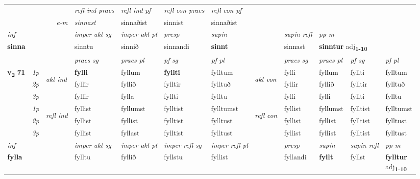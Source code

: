 \begin{longtable}[l]{X>{\footnotesize\itshape}llXXXXlXXXX}
 & && \textit{refl ind praes} & \textit{refl ind pf} & \textit{refl con praes} & \textit{refl con pf} \\*
\multicolumn{3}{r}{\textit{e-m}}& sinnast & sinnaðist & sinnist & sinnaðist \\*

\cmidrule{4-7}
   {\textit{inf}} & &  & \textit{imper akt sg} & \textit{imper akt pl}   & \textit{presp} & \textit{supin} && \textit{supin refl} & \textit{pp m} \\*
  {\textbf{sinna}} & && sinntu  & sinnið   & sinnandi &  \textbf{sinnt} && sinnast & \multicolumn{2}{l}{\textbf{sinntur} adj\textbf{\textsubscript{1-10}}} \\*

\midrule

 & &   & \textit{praes sg}  & \textit{praes pl}    & \textit{ pf sg} & \textit{pf pl} & & \textit{praes sg}  & \textit{praes pl}    & \textit{pf sg} & \textit{pf pl }  \\ \cmidrule{4-7} \cmidrule{9-12}
 \multirow{2}{*}{{{\textbf{v{\textsubscript{2}}} \Large{\textbf{71}}}}}  & 1p & \multirow{3}{*}{\begin{turn}{90}\textit{akt ind}\end{turn}} & \textbf{fylli} & fyllum & \textbf{fyllti} & fylltum & \multirow{3}{*}{\begin{turn}{90}\textit{akt con}\end{turn}} &fylli & fyllum & fyllti & fylltum\\*
 & 2p &  &  fyllir  & fyllið & fylltir & fylltuð & & fyllir & fyllið & fylltir & fylltuð \\*
 & 3p &  & fyllir & fylla & fyllti & fylltu & & fylli & fylli& fyllti & fylltu \\*
\cmidrule{4-7} \cmidrule{9-12}
 & 1p & \multirow{3}{*}{\begin{turn}{90}\textit{refl ind}\end{turn}}  & fyllist & fyllumst & fylltist & fylltumst & \multirow{3}{*}{\begin{turn}{90}\textit{refl con}\end{turn}}  &fyllist & fyllumst & fylltist & fylltumst \\*
 & 2p &  & fyllist & fyllist & fylltist & fylltust & &fyllist & fyllist & fylltist & fylltust \\*
 & 3p  & & fyllist & fyllast & fylltist & fylltust & & fyllist & fyllist& fylltist & fylltust \\*
\cmidrule{4-7} \cmidrule{9-12}

   {\textit{inf}} & &  & \textit{imper akt sg} & \textit{imper akt pl} & \textit{imper refl sg} & \textit{imper refl pl} && \textit{presp} & \textit{supin} & \textit{supin refl} & \textit{pp m} \\*
  {\textbf{fylla}} & && fylltu  & fyllið & fyllstu & fyllist && fyllandi &  \textbf{fyllt} & fyllst & \specialcell{\textbf{fylltur} \\ adj\textbf{\textsubscript{1-10}}} \\*


\end{longtable}
